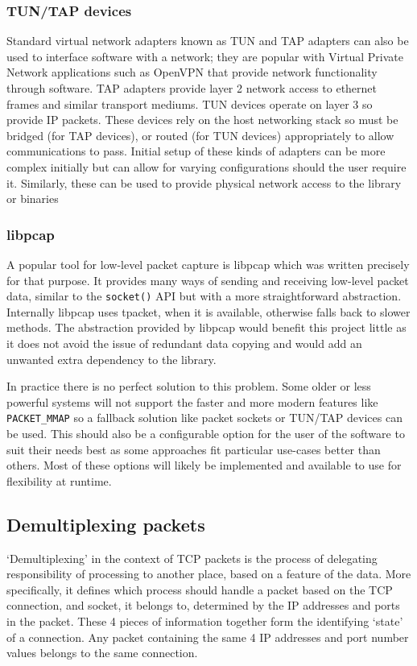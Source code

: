 \documentclass[11pt,a4paper,british]{bhamarticle}
\begin{document}
\begin{multicols}{2}
\subsubsection{TUN/TAP devices}
Standard virtual network adapters known as TUN and TAP adapters can also be used to interface software with a network; they are popular with Virtual Private Network applications such as OpenVPN that provide network functionality through software. TAP adapters provide layer 2 network access to ethernet frames and similar transport mediums. TUN devices operate on layer 3 so provide IP packets. These devices rely on the host networking stack so must be bridged (for TAP devices), or routed (for TUN devices) appropriately to allow communications to pass. Initial setup of these kinds of adapters can be more complex initially but can allow for varying configurations should the user require it. Similarly, these can be used to provide physical network access to the library or binaries

\subsubsection{libpcap}
A popular tool for low-level packet capture is libpcap which was written precisely for that purpose. It provides many ways of sending and receiving low-level packet data, similar to the \texttt{socket()} API but with a more straightforward abstraction. Internally libpcap uses tpacket, when it is available, otherwise falls back to slower methods. The abstraction provided by libpcap would benefit this project little as it does not avoid the issue of redundant data copying and would add an unwanted extra dependency to the library.

In practice there is no perfect solution to this problem. Some older or less powerful systems will not support the faster and more modern features like \texttt{PACKET\_MMAP} so a fallback solution like packet sockets or TUN/TAP devices can be used. This should also be a configurable option for the user of the software to suit their needs best as some approaches fit particular use-cases better than others. Most of these options will likely be implemented and available to use for flexibility at runtime.

\subsection{Demultiplexing packets}\label{sec:impl-demult}
`Demultiplexing' in the context of TCP packets is the process of delegating responsibility of processing to another place, based on a feature of the data. More specifically, it defines which process should handle a packet based on the TCP connection, and socket, it belongs to, determined by the IP addresses and ports in the packet. These 4 pieces of information together form the identifying `state' of a connection. Any packet containing the same 4 IP addresses and port number values belongs to the same connection.


\end{multicols}
\end{document}
